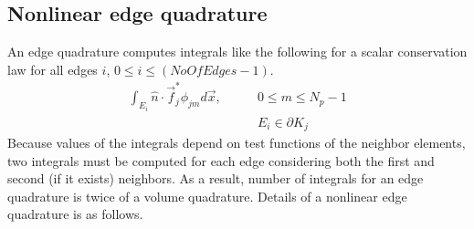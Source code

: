 \documentclass[BoSSSForSolvingConservationLaws.tex]{subfiles}
\begin{document}
\subsection{Nonlinear edge quadrature}
An edge quadrature computes integrals like the following for a scalar conservation law for all edges $i$, $0\leq i \leq (NoOfEdges-1)$.
\begin{align*}
 \int_{E_i} \hat{n}\cdot \vec{f}_j^* \phi_{jm} d\vec{x}, \qquad &0\leq m \leq N_p-1\\
 &E_i \in \partial K_j
\end{align*}
Because values of the integrals depend on test functions of the neighbor elements, two integrals must be computed for each edge considering both the first and second (if it exists) neighbors. As a result, number of integrals for an edge quadrature is twice of a volume quadrature. Details of a nonlinear edge quadrature is as follows.
\end{document}

